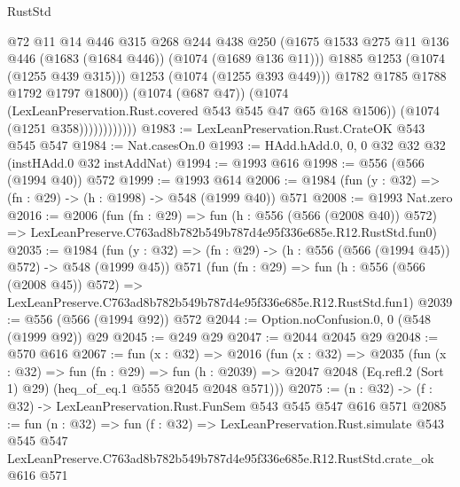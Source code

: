 \begin{lexlean}{RustStd}
\begin{coremodule}
                                @72
                                @11
                                @14
                                @446
                                @315
                                @268
                                @244
                                @438
                                @250
                                (@1675
                                  @1533
                                  @275
                                  @11
                                  @136
                                  @446
                                  (@1683 (@1684 @446))
                                  (@1074 (@1689 @136 @11)))
                                @1885
                                @1253
                                (@1074 (@1255 @439 @315)))
                              @1253
                              (@1074 (@1255 @393 @449)))
                            @1782
                            @1785
                            @1788
                            @1792
                            @1797
                            @1800))
                        (@1074 (@687 @47))
                        (@1074 (LexLeanPreservation.Rust.covered @543 @545 @47 @65 @168 @1506))
                        (@1074 (@1251 @358))))))))))))
@1983 := LexLeanPreservation.Rust.CrateOK @543 @545 @547
@1984 := Nat.casesOn.{0}
@1993 := HAdd.hAdd.{0, 0, 0} @32 @32 @32 (instHAdd.{0} @32 instAddNat)
@1994 := @1993 @616
@1998 := @556 (@566 (@1994 @40)) @572
@1999 := @1993 @614
@2006 := @1984 (fun (y : @32) => (fn : @29) -> (h : @1998) -> @548 (@1999 @40)) @571
@2008 := @1993 Nat.zero
@2016 := @2006
    (fun (fn : @29) =>
    fun (h : @556 (@566 (@2008 @40)) @572) =>
    LexLeanPreserve.C763ad8b782b549b787d4e95f336e685e.R12.RustStd.fun0)
@2035 := @1984
    (fun (y : @32) => (fn : @29) -> (h : @556 (@566 (@1994 @45)) @572) -> @548 (@1999 @45))
    @571
    (fun (fn : @29) =>
    fun (h : @556 (@566 (@2008 @45)) @572) =>
    LexLeanPreserve.C763ad8b782b549b787d4e95f336e685e.R12.RustStd.fun1)
@2039 := @556 (@566 (@1994 @92)) @572
@2044 := Option.noConfusion.{0, 0} (@548 (@1999 @92)) @29
@2045 := @249 @29
@2047 := @2044 @2045 @29
@2048 := @570 @616
@2067 := fun (x : @32) =>
  @2016
    (fun (x : @32) =>
    @2035
      (fun (x : @32) =>
      fun (fn : @29) =>
      fun (h : @2039) =>
      @2047 @2048 (Eq.refl.{2} (Sort 1) @29) (heq_of_eq.{1} @555 @2045 @2048 @571)))
@2075 := (n : @32) -> (f : @32) -> LexLeanPreservation.Rust.FunSem @543 @545 @547 @616 @571
@2085 := fun (n : @32) =>
  fun (f : @32) =>
  LexLeanPreservation.Rust.simulate
    @543
    @545
    @547
    LexLeanPreserve.C763ad8b782b549b787d4e95f336e685e.R12.RustStd.crate_ok
    @616
    @571
\end{coremodule}
\end{lexlean}
